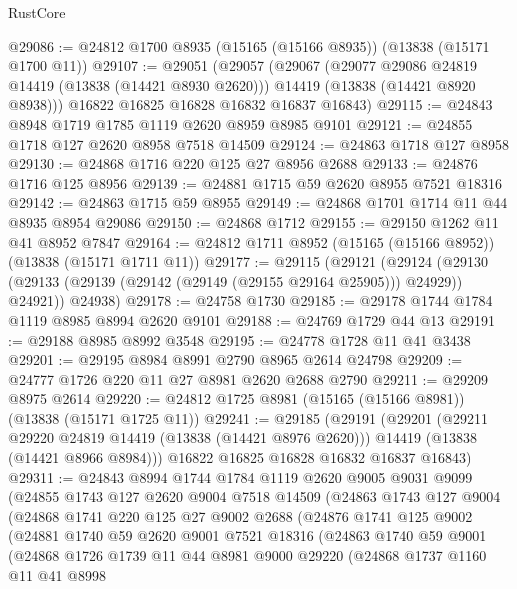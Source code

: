 \begin{lexlean}{RustCore}
\begin{coremodule}
@29086 := @24812 @1700 @8935 (@15165 (@15166 @8935)) (@13838 (@15171 @1700 @11))
@29107 := @29051
    (@29057
      (@29067
        (@29077 @29086 @24819 @14419 (@13838 (@14421 @8930 @2620)))
        @14419
        (@13838 (@14421 @8920 @8938)))
      @16822
      @16825
      @16828
      @16832
      @16837
      @16843)
@29115 := @24843 @8948 @1719 @1785 @1119 @2620 @8959 @8985 @9101
@29121 := @24855 @1718 @127 @2620 @8958 @7518 @14509
@29124 := @24863 @1718 @127 @8958
@29130 := @24868 @1716 @220 @125 @27 @8956 @2688
@29133 := @24876 @1716 @125 @8956
@29139 := @24881 @1715 @59 @2620 @8955 @7521 @18316
@29142 := @24863 @1715 @59 @8955
@29149 := @24868 @1701 @1714 @11 @44 @8935 @8954 @29086
@29150 := @24868 @1712
@29155 := @29150 @1262 @11 @41 @8952 @7847
@29164 := @24812 @1711 @8952 (@15165 (@15166 @8952)) (@13838 (@15171 @1711 @11))
@29177 := @29115
    (@29121
      (@29124 (@29130 (@29133 (@29139 (@29142 (@29149 (@29155 @29164 @25905))) @24929)) @24921))
      @24938)
@29178 := @24758 @1730
@29185 := @29178 @1744 @1784 @1119 @8985 @8994 @2620 @9101
@29188 := @24769 @1729 @44 @13
@29191 := @29188 @8985 @8992 @3548
@29195 := @24778 @1728 @11 @41 @3438
@29201 := @29195 @8984 @8991 @2790 @8965 @2614 @24798
@29209 := @24777 @1726 @220 @11 @27 @8981 @2620 @2688 @2790
@29211 := @29209 @8975 @2614
@29220 := @24812 @1725 @8981 (@15165 (@15166 @8981)) (@13838 (@15171 @1725 @11))
@29241 := @29185
    (@29191
      (@29201
        (@29211 @29220 @24819 @14419 (@13838 (@14421 @8976 @2620)))
        @14419
        (@13838 (@14421 @8966 @8984)))
      @16822
      @16825
      @16828
      @16832
      @16837
      @16843)
@29311 := @24843
    @8994
    @1744
    @1784
    @1119
    @2620
    @9005
    @9031
    @9099
    (@24855
      @1743
      @127
      @2620
      @9004
      @7518
      @14509
      (@24863
        @1743
        @127
        @9004
        (@24868
          @1741
          @220
          @125
          @27
          @9002
          @2688
          (@24876
            @1741
            @125
            @9002
            (@24881
              @1740
              @59
              @2620
              @9001
              @7521
              @18316
              (@24863
                @1740
                @59
                @9001
                (@24868
                  @1726
                  @1739
                  @11
                  @44
                  @8981
                  @9000
                  @29220
                  (@24868
                    @1737
                    @1160
                    @11
                    @41
                    @8998

\end{coremodule}
\end{lexlean}
